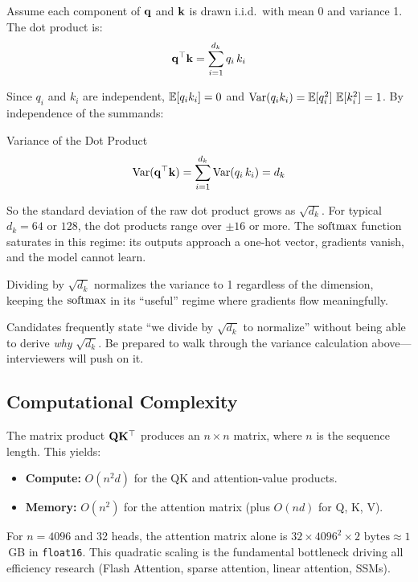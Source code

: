 Assume each component of $\mathbf{q}$ and $\mathbf{k}$ is drawn i.i.d.\ with mean 0 and
variance 1.  The dot product is:
\[
    \mathbf{q}^\top \mathbf{k} = \sum_{i=1}^{d_k} q_i \, k_i
\]

Since $q_i$ and $k_i$ are independent, $\operatorname{\mathbb{E}}[q_i k_i] = 0$ and
$\operatorname{Var}(q_i k_i) = \operatorname{\mathbb{E}}[q_i^2]\,\operatorname{\mathbb{E}}[k_i^2] = 1$.  By independence of the summands:

\begin{mathresult}{Variance of the Dot Product}
\[
    \operatorname{Var}(\mathbf{q}^\top \mathbf{k}) = \sum_{i=1}^{d_k} \operatorname{Var}(q_i\, k_i) = d_k
\]
\end{mathresult}

So the standard deviation of the raw dot product grows as $\sqrt{d_k}$.  For
typical $d_k = 64$ or $128$, the dot products range over $\pm 16$ or more.
The $\operatorname{softmax}$ function saturates in this regime: its outputs approach a one-hot
vector, gradients vanish, and the model cannot learn.

Dividing by $\sqrt{d_k}$ normalizes the variance to 1 regardless of the
dimension, keeping the $\operatorname{softmax}$ in its ``useful'' regime where gradients
flow meaningfully.

\begin{warningbox}
Candidates frequently state ``we divide by $\sqrt{d_k}$ to normalize'' without
being able to derive \emph{why} $\sqrt{d_k}$.  Be prepared to walk through the
variance calculation above---interviewers will push on it.
\end{warningbox}

\subsection{Computational Complexity}

The matrix product $\mathbf{Q} \mathbf{K}^\top$ produces an $n \times n$ matrix, where $n$
is the sequence length.  This yields:

\begin{itemize}
    \item \textbf{Compute:} $O(n^2 d)$ for the QK and attention-value products.
    \item \textbf{Memory:} $O(n^2)$ for the attention matrix (plus $O(nd)$
          for Q, K, V).
\end{itemize}

For $n = 4096$ and 32 heads, the attention matrix alone is
$32 \times 4096^2 \times 2\text{ bytes} \approx 1$\,GB in \texttt{float16}.
This quadratic scaling is the fundamental bottleneck driving all efficiency
research (Flash Attention, sparse attention, linear attention, SSMs).

